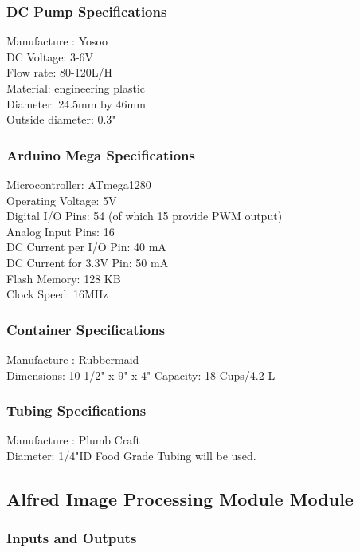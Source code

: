 \documentclass [10pt]{article}
\begin{document}
\subsubsection{DC Pump Specifications}
Manufacture : Yosoo \\
DC Voltage: 3-6V\\
Flow rate: 80-120L/H\\
Material: engineering plastic\\
Diameter: 24.5mm by 46mm \\
Outside diameter:  0.3" 

\subsubsection{Arduino Mega Specifications} 
Microcontroller:	ATmega1280\\
Operating Voltage:	5V\\
Digital I/O Pins: 54 (of which 15 provide PWM output)\\
Analog Input Pins: 16\\
DC Current per I/O Pin: 40 mA\\
DC Current for 3.3V Pin: 50 mA\\
Flash Memory: 128 KB\\
Clock Speed: 16MHz\\

\subsubsection{Container Specifications} 

Manufacture : Rubbermaid \\
Dimensions: 10 1/2" x 9" x 4" 
Capacity: 18 Cups/4.2 L\\
\subsubsection{Tubing Specifications}
Manufacture : Plumb Craft \\
Diameter: 1/4"ID Food Grade Tubing will be used.\\

\subsection{Alfred Image Processing Module Module}

\subsubsection{Inputs and Outputs}
\end{document}
